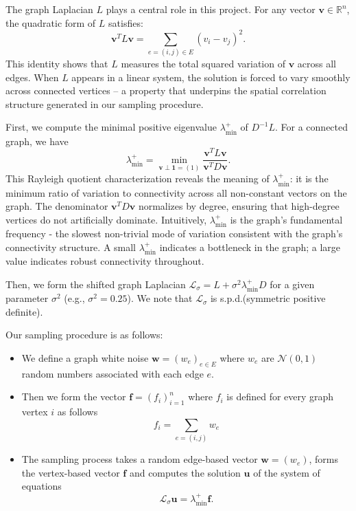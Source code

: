 \documentclass[a4paper,12pt]{amsart}
\numberwithin{equation}{section}
\def\bv{{\mathbf v}}
\def\bu{{\mathbf u}}
\def\bw{{\mathbf w}}
\def\bbf{{\mathbf f}}
\newcommand{\N}{{\mathcal N}}
\renewcommand{\L}{{\mathcal L}}
\def\bone{{\boldsymbol 1}}
\begin{document}
The graph Laplacian $L$ plays a central role in this project. For any vector 
$\bv \in \mathbb{R}^n$, the quadratic form of $L$ satisfies:
\begin{equation}\label{quadratic form}
\bv^T L \bv = \sum_{e=(i,j) \in E} (v_i - v_j)^2.
\end{equation}
This identity shows that $L$ measures the total squared variation of $\bv$ 
across all edges. When $L$ appears in a linear system, the solution is forced 
to vary smoothly across connected vertices -- a property that underpins the 
spatial correlation structure generated in our sampling procedure.

First, we compute the minimal positive eigenvalue $\lambda^+_{\min}$ of 
$D^{-1} L$. For a connected graph, we have
\begin{equation*}
\lambda^+_{\min} = \min\limits_{\bv \perp \bone = (1)} \frac{\bv^T L \bv}{ \bv^T D \bv}.
\end{equation*}
This Rayleigh quotient characterization reveals the meaning of 
$\lambda^+_{\min}$: it is the minimum ratio of variation to connectivity 
across all non-constant vectors on the graph. The denominator $\bv^T D \bv$ 
normalizes by degree, ensuring that high-degree vertices do not artificially 
dominate. Intuitively, $\lambda^+_{\min}$ is the graph's fundamental 
frequency - the slowest non-trivial mode of variation consistent with the 
graph's connectivity structure. A small $\lambda^+_{\min}$ indicates a 
bottleneck in the graph; a large value indicates robust connectivity 
throughout.

Then, we form the shifted graph Laplacian
$\L_\sigma  = L + \sigma^2\lambda^+_{\min} D$
for a given parameter $\sigma^2$ (e.g., $\sigma^2 = 0.25$). We note that 
$\L_\sigma$ is s.p.d.(symmetric positive definite).

Our sampling procedure is as follows:
\begin{itemize}
\item 
We define a graph white noise $\bw = (w_e)_{e \in E}$ where $w_e$ are 
$\N(0,1)$ random numbers associated with each edge $e$. 

\item Then we form the vector $\bbf = (f_i)_{i=1}^{n}$ where $f_i$ is defined for 
every graph vertex $i$ as follows
\begin{equation*}
    f_i = \sum\limits_{e=(i,j)} w_e
\end{equation*}

\item The sampling process takes a random edge-based vector $\bw  = (w_e)$, 
forms the vertex-based vector $\bbf$ and computes the solution $\bu$ of the 
system of equations
\begin{equation}\label{shifted graph Laplacian white noise}
\L_\sigma \bu =  \lambda^+_{\min} \bbf.
\end{equation}
\end{itemize}
\end{document}
